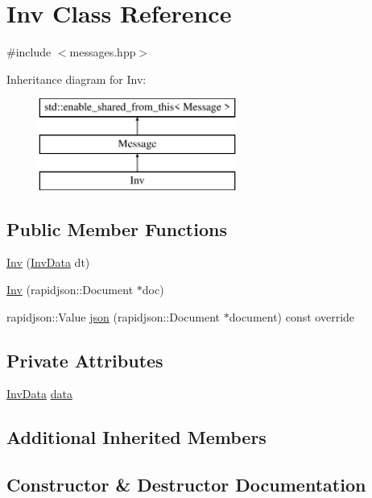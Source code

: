 \hypertarget{classInv}{}\section{Inv Class Reference}
\label{classInv}


{\ttfamily \#include $<$messages.\+hpp$>$}

Inheritance diagram for Inv\+:\begin{figure}[H]
\begin{center}
\leavevmode
\includegraphics[height=3.000000cm]{classInv}
\end{center}
\end{figure}
\subsection*{Public Member Functions}
\begin{DoxyCompactItemize}
\item 
\mbox{\hyperlink{classInv_adb19ce28d1bf632581bfe7f7c3a3e9e1}{Inv}} (\mbox{\hyperlink{structInvData}{Inv\+Data}} dt)
\item 
\mbox{\hyperlink{classInv_a4b26ec79d84c931c4e09d0c1111c4f74}{Inv}} (rapidjson\+::\+Document $\ast$doc)
\item 
rapidjson\+::\+Value \mbox{\hyperlink{classInv_a815854f9808009dbf9f0fdb1159061c5}{json}} (rapidjson\+::\+Document $\ast$document) const override
\end{DoxyCompactItemize}
\subsection*{Private Attributes}
\begin{DoxyCompactItemize}
\item 
\mbox{\hyperlink{structInvData}{Inv\+Data}} \mbox{\hyperlink{classInv_a6d4e11f9a1b4ff85c7afc65fc21bc4a9}{data}}
\end{DoxyCompactItemize}
\subsection*{Additional Inherited Members}


\subsection{Constructor \& Destructor Documentation}
\mbox{\label{classInv_adb19ce28d1bf632581bfe7f7c3a3e9e1}} 
